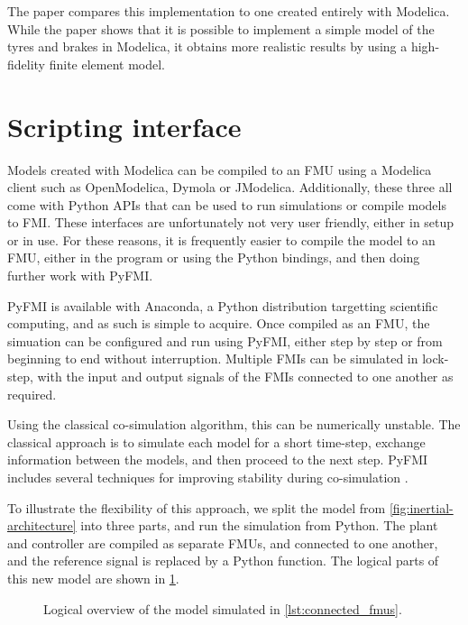 \documentclass[\rootfolder/main.tex]{subfiles}
\begin{document}
The paper compares this implementation to one created entirely with Modelica.
While the paper shows that it is possible to implement a simple model of the tyres and brakes in Modelica, it obtains more realistic results by using a high-fidelity finite element model.

\section{Scripting interface}

Models created with Modelica can be compiled to an FMU using a Modelica client such as OpenModelica, Dymola or JModelica.
Additionally, these three all come with Python APIs that can be used to run simulations or compile models to FMI.
These interfaces are unfortunately not very user friendly, either in setup or in use.
For these reasons, it is frequently easier to compile the model to an FMU, either in the program or using the Python bindings, and then doing further work with PyFMI.

PyFMI is available with Anaconda, a Python distribution targetting scientific computing, and as such is simple to acquire.
Once compiled as an FMU, the simuation can be configured and run using PyFMI, either step by step or from beginning to end without interruption.
Multiple FMIs can be simulated in lock-step, with the input and output signals of the FMIs connected to one another as required.

Using the classical co-simulation algorithm, this can be numerically unstable.
The classical approach is to simulate each model for a short time-step, exchange information between the models, and then proceed to the next step.
PyFMI includes several techniques for improving stability during co-simulation \cite{Andersson2016}.


To illustrate the flexibility of this approach, we split the model from \cref{fig:inertial-architecture} into three parts, and run the simulation from Python.
The plant and controller are compiled as separate FMUs, and connected to one another, and the reference signal is replaced by a Python function.
The logical parts of this new model are shown in \cref{fig:connected_fmus}.

\begin{figure}[ht]
    \caption{Logical overview of the model simulated in \cref{lst:connected_fmus}.\label{fig:connected_fmus}}
\end{figure}
\end{document}
